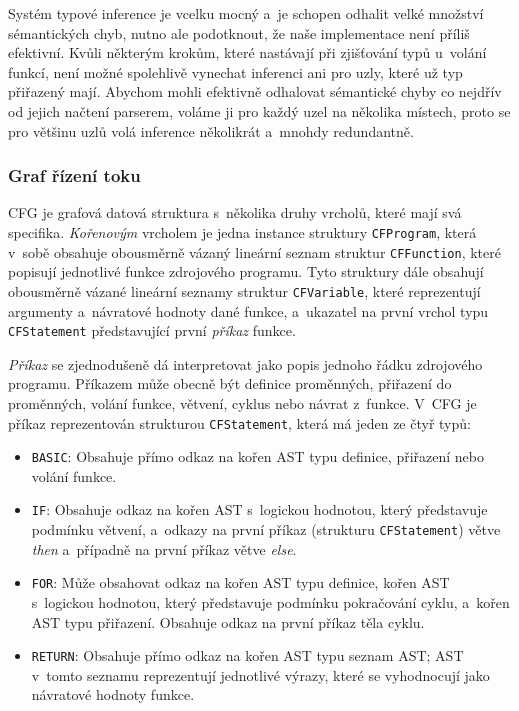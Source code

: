 \documentclass[11pt]{article}
\begin{document}
Systém typové inference je vcelku mocný a~je schopen odhalit velké množství sémantických chyb, nutno ale podotknout, že naše implementace není příliš efektivní. Kvůli některým krokům, které nastávají při zjišťování typů u~volání funkcí, není možné spolehlivě vynechat inferenci ani pro uzly, které už typ přiřazený mají. Abychom mohli efektivně odhalovat sémantické chyby co nejdřív od jejich načtení parserem, voláme ji pro každý uzel na několika místech, proto se pro většinu uzlů volá inference několikrát a~mnohdy redundantně.

\subsubsection{Graf řízení toku}

CFG je grafová datová struktura s~několika druhy vrcholů, které mají svá specifika. \emph{Kořenovým} vrcholem je jedna instance struktury \texttt{CFProgram}, která v~sobě obsahuje obousměrně vázaný lineární seznam struktur \texttt{CFFunction}, které popisují jednotlivé funkce zdrojového programu. Tyto struktury dále obsahují obousměrně vázané lineární seznamy struktur \texttt{CFVariable}, které reprezentují argumenty a~návratové hodnoty dané funkce, a~ukazatel na první vrchol typu \texttt{CFStatement} představující první \emph{příkaz} funkce.

\emph{Příkaz} se zjednodušeně dá interpretovat jako popis jednoho řádku zdrojového programu. Příkazem může obecně být definice proměnných, přiřazení do proměnných, volání funkce, větvení, cyklus nebo návrat z~funkce. V~CFG je příkaz reprezentován strukturou \texttt{CFStatement}, která má jeden ze čtyř typů:
\begin{itemize}
    \item \texttt{BASIC}: Obsahuje přímo odkaz na kořen AST typu definice, přiřazení nebo volání funkce.
    \item \texttt{IF}: Obsahuje odkaz na kořen AST s~logickou hodnotou, který představuje podmínku větvení, a~odkazy na první příkaz (strukturu \texttt{CFStatement}) větve \emph{then} a~případně na první příkaz větve \emph{else}.
    \item \texttt{FOR}: Může obsahovat odkaz na kořen AST typu definice, kořen AST s~logickou hodnotou, který představuje podmínku pokračování cyklu, a~kořen AST typu přiřazení. Obsahuje odkaz na první příkaz těla cyklu.
    \item \texttt{RETURN}: Obsahuje přímo odkaz na kořen AST typu seznam AST; AST v~tomto seznamu reprezentují jednotlivé výrazy, které se vyhodnocují jako návratové hodnoty funkce.
\end{itemize}
\end{document}
